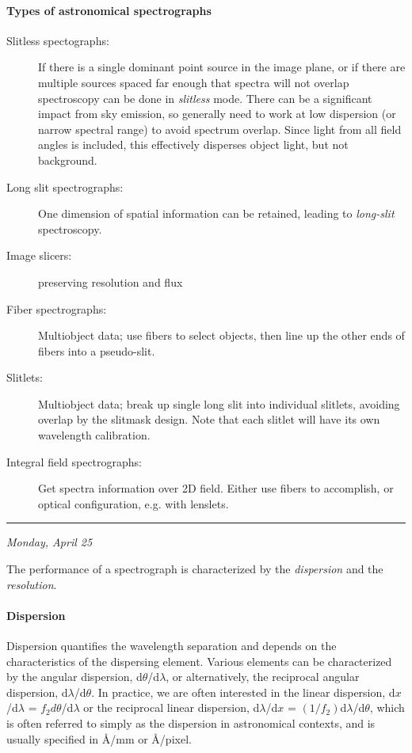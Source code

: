 \documentclass[12pt]{article}
\newcommand{\mydate}[1]{
    \begin{flushright}
        \rule{\textwidth}{0.4pt} %
        \footnotesize\hfill\textit{#1}
    \end{flushright}}
\begin{document}
\paragraph{Types of astronomical spectrographs}
\begin{description}
    \item [Slitless spectographs:] If there is a single dominant point source
        in the image plane, or if there are multiple sources spaced far enough
        that spectra will not overlap spectroscopy can be done in
        \textit{slitless} mode. There can be a significant impact from sky
        emission, so generally need to work at low dispersion (or narrow
        spectral range) to avoid spectrum overlap. Since light from all field
        angles is included, this effectively disperses object light, but not
        background.
    \item [Long slit spectrographs:]
        One dimension of spatial information can be retained, leading to
        \textit{long-slit} spectroscopy.
    \item [Image slicers:] preserving resolution and flux
    \item [Fiber spectrographs:] Multiobject data; use fibers to select
        objects, then line up the other ends of fibers into a pseudo-slit.
    \item [Slitlets:] Multiobject data; break up single long slit into
        individual slitlets, avoiding overlap by the slitmask design. Note
        that each slitlet will have its own wavelength calibration.
    \item [Integral field spectrographs:] Get spectra information over 2D
        field. Either use fibers to accomplish, or optical configuration,
        e.g. with lenslets.
\end{description}

\mydate{Monday, April 25}

The performance of a spectrograph is characterized by the \textit{dispersion}
and the \textit{resolution}.

\paragraph{Dispersion}
Dispersion quantifies the wavelength separation and depends on the
characteristics of the dispersing element. Various elements can be
characterized by the angular dispersion, d$\theta$/d$\lambda$, or
alternatively, the reciprocal angular dispersion, d$\lambda$/d$\theta$. In
practice, we are often interested in the linear dispersion, d$x$/d$\lambda$ =
$f_{2}d\theta$/d$\lambda$ or the reciprocal linear dispersion, d$\lambda$/d$x$
= $(1/f_{2})$d$\lambda$/d$\theta$, which is often referred to simply as the
dispersion in astronomical contexts, and is usually specified in \AA{}/mm or
\AA{}/pixel.
\end{document}
